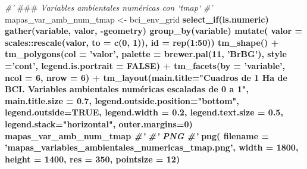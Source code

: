\documentclass[11pt,]{article}
\newenvironment{Shaded}{\begin{snugshade}}{\end{snugshade}}
\newcommand{\KeywordTok}[1]{\textcolor[rgb]{0.13,0.29,0.53}{\textbf{#1}}}
\newcommand{\DataTypeTok}[1]{\textcolor[rgb]{0.13,0.29,0.53}{#1}}
\newcommand{\DecValTok}[1]{\textcolor[rgb]{0.00,0.00,0.81}{#1}}
\newcommand{\FloatTok}[1]{\textcolor[rgb]{0.00,0.00,0.81}{#1}}
\newcommand{\StringTok}[1]{\textcolor[rgb]{0.31,0.60,0.02}{#1}}
\newcommand{\CommentTok}[1]{\textcolor[rgb]{0.56,0.35,0.01}{\textit{#1}}}
\newcommand{\OtherTok}[1]{\textcolor[rgb]{0.56,0.35,0.01}{#1}}
\newcommand{\OperatorTok}[1]{\textcolor[rgb]{0.81,0.36,0.00}{\textbf{#1}}}
\newcommand{\AlertTok}[1]{\textcolor[rgb]{0.94,0.16,0.16}{#1}}
\newcommand{\NormalTok}[1]{#1}
\begin{document}
\begin{Shaded}
\begin{Highlighting}[]
{{{{{{{\CommentTok{#' }\AlertTok{###}\CommentTok{ Variables ambientales numéricas con `tmap`}
\CommentTok{#' }
\NormalTok{mapas_var_amb_num_tmap <-}\StringTok{ }\NormalTok{bci_env_grid }\OperatorTok{%
\StringTok{  }\KeywordTok{select_if}\NormalTok{(is.numeric) }\OperatorTok{%
\StringTok{  }\KeywordTok{gather}\NormalTok{(variable, valor, }\OperatorTok{-}\NormalTok{geometry) }\OperatorTok{%
\StringTok{  }\KeywordTok{group_by}\NormalTok{(variable) }\OperatorTok{%
\StringTok{  }\KeywordTok{mutate}\NormalTok{(}
    \DataTypeTok{valor =}\NormalTok{ scales}\OperatorTok{::}\KeywordTok{rescale}\NormalTok{(valor, }\DataTypeTok{to =} \KeywordTok{c}\NormalTok{(}\DecValTok{0}\NormalTok{, }\DecValTok{1}\NormalTok{)),}
    \DataTypeTok{id =} \KeywordTok{rep}\NormalTok{(}\DecValTok{1}\OperatorTok{:}\DecValTok{50}\NormalTok{)) }\OperatorTok{%
\StringTok{  }\KeywordTok{tm_shape}\NormalTok{() }\OperatorTok{+}
\StringTok{  }\KeywordTok{tm_polygons}\NormalTok{(}\DataTypeTok{col =} \StringTok{'valor'}\NormalTok{,}
              \DataTypeTok{palette =} \KeywordTok{brewer.pal}\NormalTok{(}\DecValTok{11}\NormalTok{, }\StringTok{'BrBG'}\NormalTok{),}
              \DataTypeTok{style =}\StringTok{'cont'}\NormalTok{,}
              \DataTypeTok{legend.is.portrait =} \OtherTok{FALSE}\NormalTok{) }\OperatorTok{+}
\StringTok{  }\KeywordTok{tm_facets}\NormalTok{(}\DataTypeTok{by =} \StringTok{'variable'}\NormalTok{, }\DataTypeTok{ncol =} \DecValTok{6}\NormalTok{, }\DataTypeTok{nrow =} \DecValTok{6}\NormalTok{) }\OperatorTok{+}
\StringTok{  }\KeywordTok{tm_layout}\NormalTok{(}\DataTypeTok{main.title=}\StringTok{"Cuadros de 1 Ha de BCI. Variables ambientales numéricas escaladas de 0 a 1"}\NormalTok{,}
            \DataTypeTok{main.title.size =} \FloatTok{0.7}\NormalTok{,}
            \DataTypeTok{legend.outside.position=}\StringTok{"bottom"}\NormalTok{,}
            \DataTypeTok{legend.outside=}\OtherTok{TRUE}\NormalTok{,}
            \DataTypeTok{legend.width =} \FloatTok{0.2}\NormalTok{,}
            \DataTypeTok{legend.text.size =} \FloatTok{0.5}\NormalTok{,}
            \DataTypeTok{legend.stack=}\StringTok{"horizontal"}\NormalTok{, }
            \DataTypeTok{outer.margins=}\DecValTok{0}\NormalTok{)}
\NormalTok{mapas_var_amb_num_tmap}
\CommentTok{#'}
\CommentTok{#' PNG}
\CommentTok{#' }
\KeywordTok{png}\NormalTok{(}
  \DataTypeTok{filename =} \StringTok{'mapas_variables_ambientales_numericas_tmap.png'}\NormalTok{,}
  \DataTypeTok{width =} \DecValTok{1800}\NormalTok{, }\DataTypeTok{height =} \DecValTok{1400}\NormalTok{, }\DataTypeTok{res =} \DecValTok{350}\NormalTok{, }\DataTypeTok{pointsize =} \DecValTok{12}\NormalTok{)}
}}}}}}}}}}}}
\end{Highlighting}
\end{Shaded}
\end{document}
